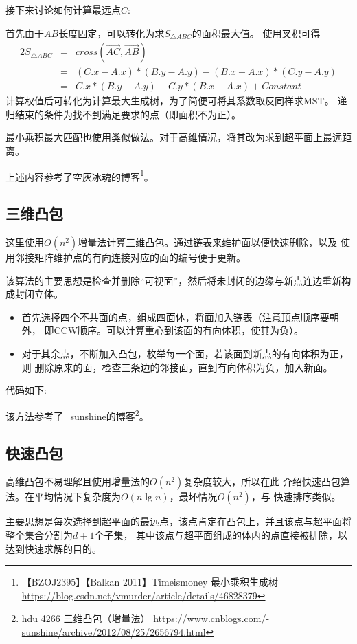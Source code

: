 接下来讨论如何计算最远点$C$:

首先由于$AB$长度固定，可以转化为求$S_{\triangle ABC}$的面积最大值。
使用叉积可得
\begin{eqnarray*}
	2S_{\triangle ABC}&=&cross(\overrightarrow{AC},\overrightarrow{AB})\\
	&=&(C.x-A.x)*(B.y-A.y)-(B.x-A.x)*(C.y-A.y)\\
	&=&C.x*(B.y-A.y)-C.y*(B.x-A.x)+Constant
\end{eqnarray*}
计算权值后可转化为计算最大生成树，为了简便可将其系数取反同样求MST。
递归结束的条件为找不到满足要求的点（即面积不为正）。

最小乘积最大匹配也使用类似做法。对于高维情况，将其改为求到超平面上最远距离。

上述内容参考了空灰冰魂的博客\footnote{
	【BZOJ2395】【Balkan 2011】Timeismoney 最小乘积生成树
	\url{https://blog.csdn.net/vmurder/article/details/46828379}
}。
\subsection{三维凸包}
这里使用$O(n^2)$增量法计算三维凸包。通过链表来维护面以便快速删除，以及
使用邻接矩阵维护点的有向连接对应的面的编号便于更新。

该算法的主要思想是检查并删除``可视面''，然后将未封闭的边缘与新点连边重新构成封闭立体。
\begin{itemize}
	\item 首先选择四个不共面的点，组成四面体，将面加入链表（注意顶点顺序要朝外，
	      即CCW顺序。可以计算重心到该面的有向体积，使其为负）。
	\item 对于其余点，不断加入凸包，枚举每一个面，若该面到新点的有向体积为正，则
	      删除原来的面，检查三条边的邻接面，直到有向体积为负，加入新面。
\end{itemize}

代码如下:


该方法参考了\_sunshine的博客\footnote{
	hdu 4266 三维凸包（增量法）
	\url{https://www.cnblogs.com/-sunshine/archive/2012/08/25/2656794.html}
}。
\subsection{快速凸包}
高维凸包不易理解且使用增量法的$O(n^2)$复杂度较大，所以在此
介绍快速凸包算法。在平均情况下复杂度为$O(n\lg n)$，最坏情况$O(n^2)$，与
快速排序类似。

主要思想是每次选择到超平面的最远点，该点肯定在凸包上，并且该点与超平面将整个集合分割为$d+1$个子集，
其中该点与超平面组成的体内的点直接被排除，以达到快速求解的目的。

